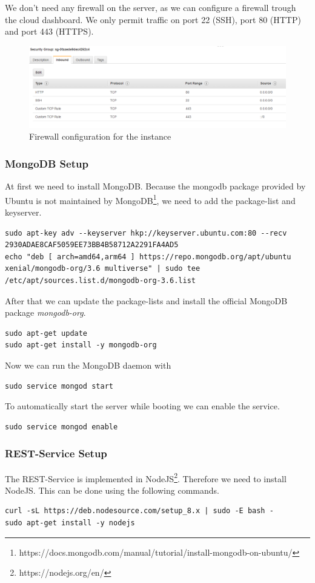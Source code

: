 We don't need any firewall on the server, as we can configure a firewall trough the cloud dashboard. We only permit traffic on port 22 (SSH), port 80 (HTTP) and port 443 (HTTPS).
\begin{figure}[H]
	\centering
	\includegraphics[width=\textwidth]{img/Security-Group}
	\caption{Firewall configuration for the instance}
	\label{fig:SecGroup}
\end{figure}

\subsubsection{MongoDB Setup}
At first we need to install MongoDB. Because the mongodb package provided by Ubuntu is not maintained by MongoDB\footnote{https://docs.mongodb.com/manual/tutorial/install-mongodb-on-ubuntu/}, we need to add the package-list and keyserver.
\begin{lstlisting}
sudo apt-key adv --keyserver hkp://keyserver.ubuntu.com:80 --recv 2930ADAE8CAF5059EE73BB4B58712A2291FA4AD5
echo "deb [ arch=amd64,arm64 ] https://repo.mongodb.org/apt/ubuntu xenial/mongodb-org/3.6 multiverse" | sudo tee /etc/apt/sources.list.d/mongodb-org-3.6.list
\end{lstlisting}

After that we can update the package-lists and install the official MongoDB package \textit{mongodb-org}.
\begin{lstlisting}
sudo apt-get update
sudo apt-get install -y mongodb-org
\end{lstlisting}

Now we can run the MongoDB daemon with
\begin{lstlisting}
sudo service mongod start
\end{lstlisting}

To automatically start the server while booting we can enable the service.
\begin{lstlisting}
sudo service mongod enable
\end{lstlisting}

\subsubsection{REST-Service Setup}
\label{sec:REST-Service}
The REST-Service is implemented in NodeJS\footnote{https://nodejs.org/en/}. Therefore we need to install NodeJS. This can be done using the following commands.
\begin{lstlisting}
curl -sL https://deb.nodesource.com/setup_8.x | sudo -E bash -
sudo apt-get install -y nodejs
\end{lstlisting}


